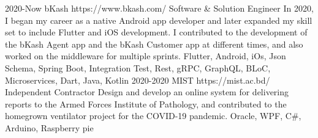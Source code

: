 
\horizontalLineRight

\listItemOne
    {2020-Now}
    {bKash}
    {https://www.bkash.com/}
    {Software \& Solution Engineer}
    {In 2020, I began my career as a native Android app developer and later expanded my skill set to include Flutter and iOS development. I contributed to the development of the bKash Agent app and the bKash Customer app at different times, and also worked on the middleware for multiple sprints.}
    {Flutter, Android, iOs, Json Schema, Spring Boot, Integration Test, Rest, gRPC, GraphQL, BLoC, Microservices, Dart, Java, Kotlin}
\listItemOne
    {2020-2020}
    {MIST}
    {https://mist.ac.bd/}
    {Independent Contractor}
    {Design and develop an online system for delivering reports to the Armed Forces Institute of Pathology,
        and contributed to the homegrown ventilator project for the COVID-19 pandemic.}
    {Oracle, WPF, C\#, Arduino, Raspberry pie}%